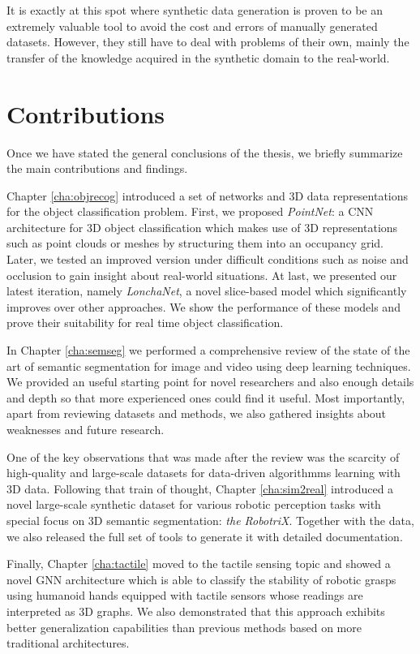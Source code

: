 It is exactly at this spot where synthetic data generation is proven to be an extremely valuable tool to avoid the cost and errors of manually generated datasets. However, they still have to deal with problems of their own, mainly the transfer of the knowledge acquired in the synthetic domain to the real-world.

\section{Contributions}
\label{cha:conclusion:sec:contributions}

Once we have stated the general conclusions of the thesis, we briefly summarize the main contributions and findings.

Chapter \ref{cha:objrecog} introduced a set of networks and \acs{3D} data representations for the object classification problem. First, we proposed \emph{PointNet}: a \acl{CNN} architecture for \acs{3D} object classification which makes use of \acs{3D} representations such as point clouds or meshes by structuring them into an occupancy grid. Later, we tested an improved version under difficult conditions such as noise and occlusion to gain insight about real-world situations. At last, we presented our latest iteration, namely \emph{LonchaNet}, a novel slice-based model which significantly improves over other approaches. We show the performance of these models and prove their suitability for real time object classification.

In Chapter \ref{cha:semseg} we performed a comprehensive review of the state of the art of semantic segmentation for image and video using deep learning techniques. We provided an useful starting point for novel researchers and also enough details and depth so that more experienced ones could find it useful. Most importantly, apart from reviewing datasets and methods, we also gathered insights about weaknesses and future research.

One of the key observations that was made after the review was the scarcity of high-quality and large-scale datasets for data-driven algorithmms learning with \ac{3D} data. Following that train of thought, Chapter \ref{cha:sim2real} introduced a novel large-scale synthetic dataset for various robotic perception tasks with special focus on 3D semantic segmentation: \emph{the RobotriX}. Together with the data, we also released the full set of tools to generate it with detailed documentation.

Finally, Chapter \ref{cha:tactile} moved to the tactile sensing topic and showed a novel \acl{GNN} architecture which is able to classify the stability of robotic grasps using humanoid hands equipped with tactile sensors whose readings are interpreted as \acs{3D} graphs. We also demonstrated that this approach exhibits better generalization capabilities than previous methods based on more traditional architectures.

